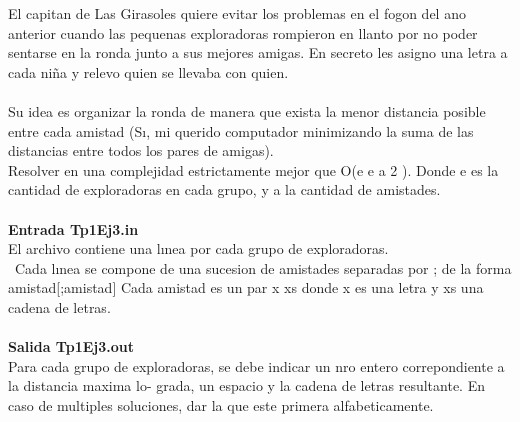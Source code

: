 El capitan de Las Girasoles quiere evitar los problemas en el fogon del ano anterior cuando las pequenas exploradoras rompieron en llanto por no poder sentarse en la ronda junto a sus mejores amigas. En secreto
les asigno una letra a cada niña y relevo quien se llevaba con quien.\\\\
Su idea es organizar la ronda de manera que exista la menor distancia posible entre cada amistad (Sı, mi
querido computador minimizando la suma de las distancias entre todos los pares de amigas).\\
Resolver en una complejidad estrictamente mejor que O(e e a 2 ). Donde e es la cantidad de exploradoras
en cada grupo, y a la cantidad de amistades.\\\\
\textbf{Entrada Tp1Ej3.in}\\
El archivo contiene una lınea por cada grupo de exploradoras.\\\
Cada lınea se compone de una sucesion de amistades separadas por ; de la forma amistad[;amistad]
Cada amistad es un par x xs donde x es una letra y xs una cadena de letras.\\\\
\textbf{Salida Tp1Ej3.out}\\
Para cada grupo de exploradoras, se debe indicar un nro entero correpondiente a la distancia maxima lo-
grada, un espacio y la cadena de letras resultante. En caso de multiples soluciones, dar la que este primera
alfabeticamente.\\
